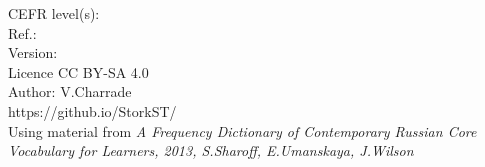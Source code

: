 \fontsize{5}{5}
\selectfont

\vspace{\baselineskip}
CEFR level(s): \level \\
Ref.:  \\
Version: \version \\
Licence CC BY-SA 4.0\\

\noindent Author: V.Charrade\\
https://github.io/StorkST/\\
Using material from \textit{A Frequency Dictionary of Contemporary Russian Core Vocabulary for Learners, 2013, S.Sharoff, E.Umanskaya, J.Wilson}
